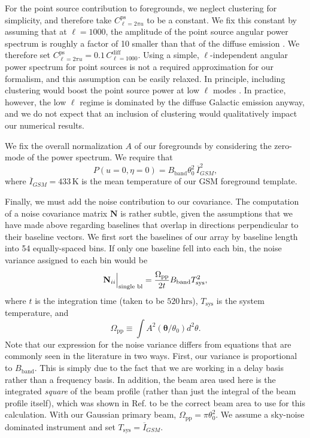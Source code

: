 \documentclass[twocolumn,aps,prd,nofootinbib,showpacs]{revtex4-1}
\begin{document}
For the point source contribution to foregrounds, we neglect clustering for simplicity, and therefore take $C_{\ell = 2 \pi u}^\textrm{ps}$ to be a constant.  We fix this constant by assuming that at $\ell = 1000$, the amplitude of the point source angular power spectrum is roughly a factor of 10 smaller than that of the diffuse emission \cite{Santos2005}.  We therefore set $C_{\ell = 2 \pi u}^\textrm{ps} = 0.1 \,C_{\ell=1000}^\textrm{diff}$.  Using a simple, $\ell$-independent angular power spectrum for point sources is not a required approximation for our formalism, and this assumption can be easily relaxed.  In principle, including clustering would boost the point source power at low $\ell$ modes \cite{DiMatteo2002}.  In practice, however, the low $\ell$ regime is dominated by the diffuse Galactic emission anyway, and we do not expect that an inclusion of clustering would qualitatively impact our numerical results.

We fix the overall normalization $A$ of our foregrounds by considering the zero-mode of the power spectrum.  We require that
\begin{equation}
P(u=0,\eta=0) = B_\textrm{band} \theta_0^2 \,\overline{I}_{GSM}^2,
\end{equation}
where $\overline{I}_{GSM} = 433\,\textrm{K}$ is the mean temperature of our GSM foreground template.

Finally, we must add the noise contribution to our covariance.  The computation of a noise covariance matrix $\mathbf{N}$ is rather subtle, given the assumptions that we have made above regarding baselines that overlap in directions perpendicular to their baseline vectors.  We first sort the baselines of our array by baseline length into 54 equally-spaced bins.  If only one baseline fell into each bin, the noise variance assigned to each bin would be \cite{Parsons2012a}
\begin{equation}
\mathbf{N}_{ii} \Big{|}_\textrm{single bl} = \frac{\Omega_{\textrm{pp}}}{2t}  B_\textrm{band} T_\textrm{sys}^2,
\end{equation}
where $t$ is the integration time (taken to be $520\,\textrm{hrs}$), $T_\textrm{sys}$ is the system temperature, and
\begin{equation}
\Omega_\textrm{pp} \equiv  \int A^2(\boldsymbol\theta  / \theta_0) d^2 \theta.
\end{equation}
Note that our expression for the noise variance differs from equations that are commonly seen in the literature in two ways.  First, our variance is proportional to $B_\textrm{band}$.  This is simply due to the fact that we are working in a delay basis rather than a frequency basis.  In addition, the beam area used here is the integrated \emph{square} of the beam profile (rather than just the integral of the beam profile itself), which was shown in Ref. \cite{Parsons2013} to be the correct beam area to use for this calculation.  With our Gaussian primary beam, $\Omega_\textrm{pp} = \pi \theta_0^2$.  We assume a sky-noise dominated instrument and set $T_\textrm{sys} = \overline{I}_{GSM}$.
\end{document}
